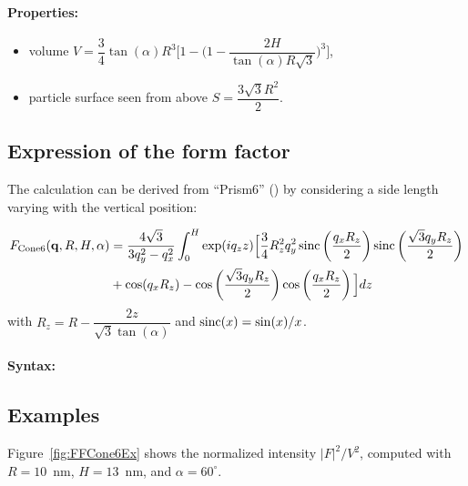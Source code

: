 \paragraph{Properties:}
\begin{itemize}
\item volume $V = \dfrac{3}{4} \tan(\alpha) R^3 \Big[
            1 - \big(1- \dfrac{2H}{ \tan(\alpha) R\sqrt{3}}\big)^3
            \Big]$,
\item  particle surface seen from above $S =\dfrac{3\sqrt{3}R^2}{2}$.
\end{itemize}

\subsection{Expression of the form factor}
The
calculation can be derived from ``Prism6'' () by
considering a side length varying with the vertical position:

\begin{align*}
F_{\rm{Cone6}}(\mathbf{q}, R, H, \alpha) &= \frac{4\sqrt{3}}{3q_y ^2 - q_x^2}\int_0 ^H \exp(iq_z z)
\Big[\frac{3}{4}R_z^2q_y^2 \operatorname{sinc}\left(\frac{q_xR_z}{2}\right)\operatorname{sinc}\left(\frac{\sqrt{3}q_y
R_z}{2}\right)\\
&+\cos(q_xR_z)-\cos\left(\frac{\sqrt{3}q_y R_z}{2}\right)\cos\left(\frac{q_xR_z}{2}\right) \Big]dz
\end{align*}
with $R_z=R-\dfrac{2z}{\sqrt{3}\tan(\alpha)}$ and $\operatorname{sinc}(x)=\sin(x)/x$.

\paragraph{Syntax:}  

\subsection{Examples}
Figure~\ref{fig:FFCone6Ex} shows the normalized intensity
$|F|^2/V^2$, computed with $R=10$~nm, $H=13$~nm, and
$\alpha=60^{\circ}$.

